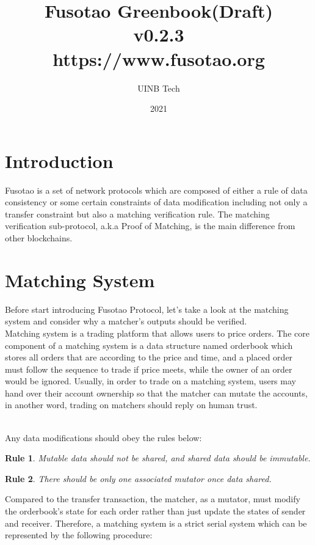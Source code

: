 \documentclass[a4paper,12pt]{article}
\author{UINB Tech}
\date{2021}
\title{Fusotao Greenbook(Draft)\\\medskip
  \large v0.2.3\\\medskip
  \large https://www.fusotao.org}
\begin{document}
\maketitle
\clearpage

\section{Introduction}
\label{sec:org5e9fe25}
Fusotao is a set of network protocols which are composed of either a rule of data consistency or some certain constraints of data modification including not only a transfer constraint but also a matching verification rule. The matching verification sub-protocol, a.k.a Proof of Matching, is the main difference from other blockchains.\\
\section{Matching System}
\label{sec:org29a156e}
Before start introducing Fusotao Protocol, let’s take a look at the matching system and consider why a matcher’s outputs should be verified.\\
Matching system is a trading platform that allows users to price orders. The core component of a matching system is a data structure named orderbook which stores all orders that are according to the price and time, and a placed order must follow the sequence to trade if price meets, while the owner of an order would be ignored. Usually, in order to trade on a matching system, users may hand over their account ownership so that the matcher can mutate the accounts, in another word, trading on matchers should reply on human trust.\\
\newtheorem{theorem}{Rule}\\
Any data modifications should obey the rules below:\\
\begin{theorem}
Mutable data should not be shared, and shared data should be immutable.
\end{theorem}
\begin{theorem}
There should be only one associated mutator once data shared.
\end{theorem}
Compared to the transfer transaction, the matcher, as a mutator, must modify the orderbook's state for each order rather than just update the states of sender and receiver. Therefore, a matching system is a strict serial system which can be represented by the following procedure:\\
\end{document}
